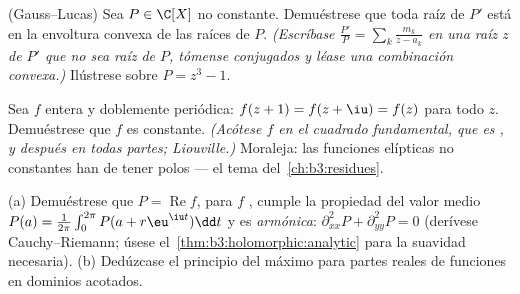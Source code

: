 \begin{exercise}[$\star\star\star$]\label{exo:b3:holomorphic:8}
(Gauss--Lucas) Sea $P \in \C[X]$ no constante. Demuéstrese que toda raíz
de $P'$ está en la envoltura convexa de las raíces de $P$.
\emph{(Escríbase $\frac{P'}{P} = \sum_k\frac{m_k}{z - a_k}$ en una raíz
$z$ de $P'$ que no sea raíz de $P$, tómense conjugados y léase una
combinación convexa.)} Ilústrese sobre
$P = z^3 - 1$.
\end{exercise}

\begin{exercise}[$\star\star\star$]\label{exo:b3:holomorphic:9}
Sea $f$ entera y doblemente periódica: $f(z + 1) = f(z + \iu)
= f(z)$ para todo $z$. Demuéstrese que $f$ es constante. \emph{(Acótese
$f$ en el cuadrado fundamental, que es
, y después en todas partes;
Liouville.)} Moraleja: las funciones elípticas no constantes han de
tener polos --- el tema del~\cref{ch:b3:residues}.
\end{exercise}

\begin{exercise}[$\star\star$]\label{exo:b3:holomorphic:10}
(a) Demuéstrese que $P = \operatorname{Re}f$, para $f$
, cumple la propiedad del
valor medio $P(a) =
\frac1{2\pi}\int_0^{2\pi}P(a + r\eu^{\iu t})\dd t$ y es \emph{armónica}:
$\partial^2_{xx}P + \partial^2_{yy}P = 0$ (derívese Cauchy--Riemann;
úsese el~\cref{thm:b3:holomorphic:analytic} para la suavidad necesaria).
(b) Dedúzcase el principio del máximo para partes reales de
funciones  en dominios
acotados.
\end{exercise}

